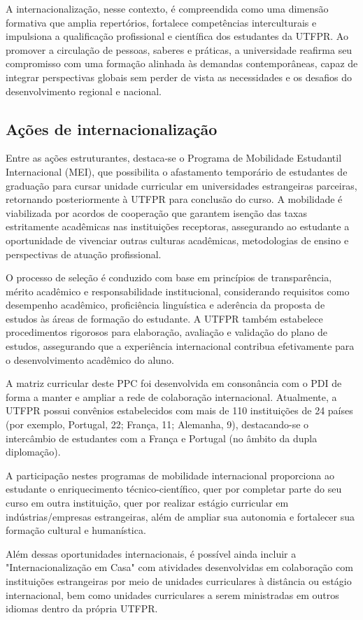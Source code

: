 A internacionalização, nesse contexto, é compreendida como uma dimensão formativa que amplia repertórios, fortalece competências interculturais e impulsiona a qualificação profissional e científica dos estudantes da UTFPR. Ao promover a circulação de pessoas, saberes e práticas, a universidade reafirma seu compromisso com uma formação alinhada às demandas contemporâneas, capaz de integrar perspectivas globais sem perder de vista as necessidades e os desafios do desenvolvimento regional e nacional.

\subsection{Ações de internacionalização}

Entre as ações estruturantes, destaca-se o Programa de Mobilidade Estudantil Internacional (MEI), que possibilita o afastamento temporário de estudantes de graduação para cursar unidade curricular em universidades estrangeiras parceiras, retornando posteriormente à UTFPR para conclusão do curso. A mobilidade é viabilizada por acordos de cooperação que garantem isenção das taxas estritamente acadêmicas nas instituições receptoras, assegurando ao estudante a oportunidade de vivenciar outras culturas acadêmicas, metodologias de ensino e perspectivas de atuação profissional.

O processo de seleção é conduzido com base em princípios de transparência, mérito acadêmico e responsabilidade institucional, considerando requisitos como desempenho acadêmico, proficiência linguística e aderência da proposta de estudos às áreas de formação do estudante. A UTFPR também estabelece procedimentos rigorosos para elaboração, avaliação e validação do plano de estudos, assegurando que a experiência internacional contribua efetivamente para o desenvolvimento acadêmico do aluno.

A matriz curricular deste PPC foi desenvolvida em consonância com o PDI de forma a manter e ampliar a rede de colaboração internacional. Atualmente, a UTFPR possui  convênios estabelecidos com mais de 110 instituições de 24 países (por exemplo, Portugal, 22; França, 11; Alemanha, 9), destacando-se o intercâmbio de estudantes com a França e Portugal (no âmbito da dupla diplomação).

A participação nestes programas de mobilidade internacional proporciona ao estudante o enriquecimento técnico-científico, quer por completar parte do seu curso em outra instituição, quer por realizar estágio curricular em indústrias/empresas estrangeiras, além de  ampliar sua autonomia e fortalecer sua formação cultural e humanística.

Além dessas oportunidades internacionais, é possível ainda incluir a "Internacionalização em Casa" com atividades desenvolvidas em colaboração com instituições estrangeiras por meio de unidades curriculares à distância ou estágio internacional, bem como unidades curriculares a serem ministradas em outros idiomas dentro da própria UTFPR.
